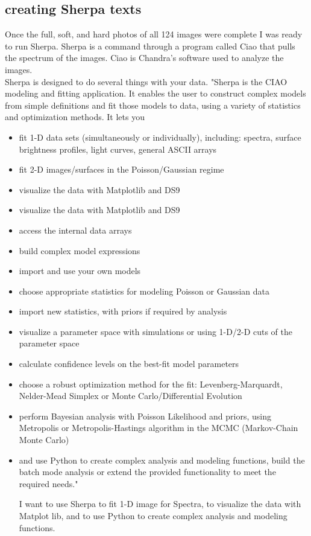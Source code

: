 \documentclass[12pt]{report}
\begin{document}
\subsection{creating Sherpa texts}
Once the full, soft, and hard photos of all 124 images were complete I was ready to run Sherpa. Sherpa is a command through a program called Ciao that pulls the spectrum of the images. Ciao is Chandra's software used to analyze the images.\\

Sherpa is designed to do several things with your data. "Sherpa is the CIAO modeling and fitting application. It enables the user to construct complex models from simple definitions and fit those models to data, using a variety of statistics and optimization methods. It lets you
\begin{itemize}
    \item fit 1-D data sets (simultaneously or individually), including:
spectra, surface brightness profiles, light curves, general ASCII arrays
    \item fit 2-D images/surfaces in the Poisson/Gaussian regime
    \item visualize the data with Matplotlib and DS9
    \item visualize the data with Matplotlib and DS9
    \item access the internal data arrays
    \item build complex model expressions
    \item import and use your own models
    \item choose appropriate statistics for modeling Poisson or Gaussian data
    \item import new statistics, with priors if required by analysis
    \item visualize a parameter space with simulations or using 1-D/2-D cuts of the parameter space
    \item calculate confidence levels on the best-fit model parameters
    \item choose a robust optimization method for the fit: Levenberg-Marquardt, Nelder-Mead Simplex or Monte Carlo/Differential Evolution
    \item perform Bayesian analysis with Poisson Likelihood and priors, using Metropolis or Metropolis-Hastings algorithm in the MCMC (Markov-Chain Monte Carlo)
    \item and use Python to create complex analysis and modeling functions, build the batch mode analysis or extend the provided functionality to meet the required needs." \cite{Doe1_2023}

I want to use Sherpa to fit 1-D image for Spectra, to visualize the data with Matplot lib, and to use Python to create complex analysis and modeling functions.

\end{itemize}
\end{document}
